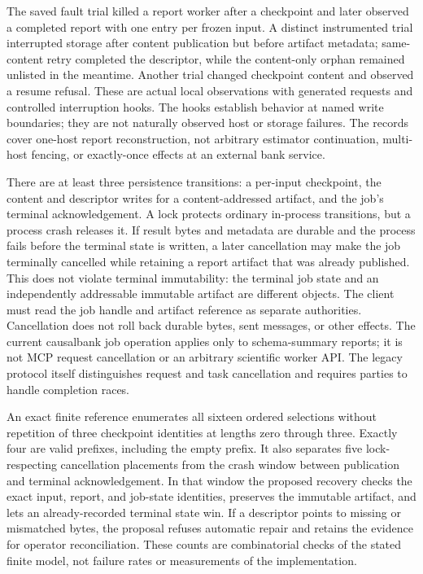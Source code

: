 The saved fault trial killed a report worker after a checkpoint and later
observed a completed report with one entry per frozen input. A distinct
instrumented trial interrupted storage after content publication but before
artifact metadata; same-content retry completed the descriptor, while the
content-only orphan remained unlisted in the meantime. Another trial changed
checkpoint content and observed a resume refusal. These are actual local
observations with generated requests and controlled interruption hooks. The
hooks establish behavior at named write boundaries; they are not naturally
observed host or storage failures. The records cover one-host report
reconstruction, not arbitrary estimator continuation, multi-host fencing, or
exactly-once effects at an external bank service.
\citep{exec14_failure_observations,exec13_ops_faults}

There are at least three persistence transitions: a per-input checkpoint, the
content and descriptor writes for a content-addressed artifact, and the job's
terminal acknowledgement. A lock protects ordinary in-process transitions,
but a process crash releases it. If result bytes and metadata are durable and
the process fails before the terminal state is written, a later cancellation
may make the job terminally cancelled while retaining a report artifact that
was already published. This does not violate terminal immutability: the
terminal job state and an independently addressable immutable artifact are
different objects. The client must read the job handle and artifact reference
as separate authorities. Cancellation does not roll back durable bytes, sent
messages, or other effects. The current causalbank job operation applies only
to schema-summary reports; it is not MCP request cancellation or an arbitrary
scientific worker API. The legacy protocol itself distinguishes request and
task cancellation and requires parties to handle completion races.
\citep{v12_mcp_legacy_cancellation,exec14_failure_implementation}

An exact finite reference enumerates all sixteen ordered selections without
repetition of three checkpoint identities at lengths zero through three.
Exactly four are valid prefixes, including the empty prefix. It also separates
five lock-respecting cancellation placements from the crash window between
publication and terminal acknowledgement. In that window the proposed recovery
checks the exact input, report, and job-state identities, preserves the
immutable artifact, and lets an already-recorded terminal state win. If a
descriptor points to missing or mismatched bytes, the proposal refuses
automatic repair and retains the evidence for operator reconciliation. These
counts are combinatorial checks of the stated finite model, not failure rates
or measurements of the implementation.
\citep{exec17_continuity_reference}

